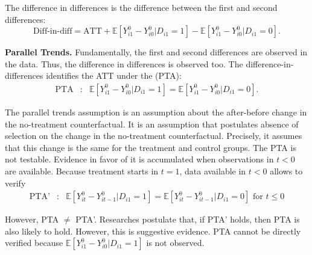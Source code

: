 \noindent The difference in differences is the difference between the first and second differences: 
\begin{equation}
\text{Diff-in-diff} =  \text{ATT}  + \mathbb{E}  \left[  Y_{i1}^0 -  Y_{i0}^0 | D_{i1} = 1\right] -  \mathbb{E}  \left[  Y_{i1}^0 -  Y_{i0}^0 | D_{i1} = 0 \right]. \label{eq:diffindiff}
\end{equation}

\noindent \textbf{Parallel Trends.} Fundamentally, the first and second differences are observed in the data. Thus, the difference in differences is observed too. The difference-in-differences identifies the ATT under the  (PTA):
\begin{eqnarray} 
\text{PTA} &:&  \mathbb{E}  \left[  Y_{i1}^0 -  Y_{i0}^0 | D_{i1} = 1\right] =  \mathbb{E}  \left[  Y_{i1}^0 -  Y_{i0}^0 | D_{i1} = 0 \right].
\end{eqnarray}

\noindent The parallel trends assumption is an assumption about the after-before change in the no-treatment counterfactual. It is an assumption that postulates absence of selection on the change in the no-treatment counterfactual. Precisely, it assumes that this change is the same for the treatment and control groups. The PTA is not testable. Evidence in favor of it is accumulated when observations in $t < 0$ are available. Because treatment starts in $t = 1$, data available in $t < 0$ allows to verify
\begin{eqnarray} 
\text{PTA'} &:&  \mathbb{E}  \left[  Y_{it}^0 -  Y_{i{t-1}}^0 | D_{i1} = 1\right] =  \mathbb{E}  \left[  Y_{it}^0 -  Y_{i{t-1}}^0 | D_{i1} = 0 \right] \text{ for } t \leq  0
\end{eqnarray}

\noindent However, PTA $\neq$ PTA'. Researches postulate that, if PTA' holds, then PTA is also likely to hold. However, this is suggestive evidence. PTA cannot be directly verified because $\mathbb{E}  \left[  Y_{i1}^0 -  Y_{i0}^0 | D_{i1} = 1\right]$ is not observed.\\

